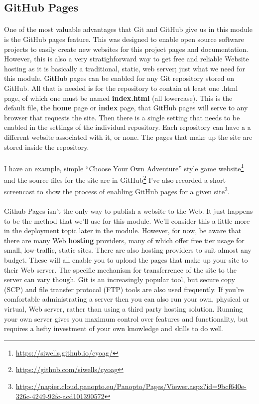 \documentclass[10pt, a4paper]{article}
\begin{document}
\subsection{GitHub Pages}
\paragraph{} One of the most valuable advantages that Git and GitHub give us in this module is the GitHub pages feature. This was designed to enable open source software projects to easily create new websites for this project pages and documentation. However, this is also a very stratighforward way to get free and reliable Website hosting as it is basically a traditional, static, web server; just what we need for this module. GitHub pages can be enabled for any Git repository stored on GitHub. All that is needed is for the repository to contain at least one .html page, of which one must be named {\bf{index.html}} (all lowercase). This is the default file, the {\bf{home}} page or {\bf{index}} page, that GitHub pages will serve to any browser that requests the site. Then there is a single setting that needs to be enabled in the settings of the individual repository. Each repository can have a a different website associated with it, or none. The pages that make up the site are stored inside the repository.

\paragraph{} I have an example, simple ``Choose Your Own Adventure'' style game website\footnote{\url{https://siwells.github.io/cyoag/}} and the source-files for the site are in GitHub\footnote{\url{https://github.com/siwells/cyoag}} I've also recorded a short screencast to show the process of enabling GitHub pages for a given site\footnote{\url{https://napier.cloud.panopto.eu/Panopto/Pages/Viewer.aspx?id=9bcf640e-326c-4249-92fc-acd101390572}}.

\paragraph{} Github Pages isn't the only way to publish a website to the Web. It just happens to be the method that we'll use for this module. We'll consider this a little more in the deployment topic later in the module. However, for now, be aware that there are many Web {\bf{hosting}} providers, many of which offer free tier usage for small, low-traffic, static sites. There are also hosting providers to suit almost any budget. These will all enable you to upload the pages that make up your site to their Web server. The specific mechanism for transferrence of the site to the server can vary though. Git is an increasingly popular tool, but secure copy (SCP) and file transfer protocol (FTP) tools are also used frequently. If you're comfortable administrating a server then you can also run your own, physical or virtual, Web server, rather than using a third party hosting solution. Running your own server gives you maximum control over features and functionality, but requires a hefty investment of your own knowledge and skills to do well.
\end{document}
